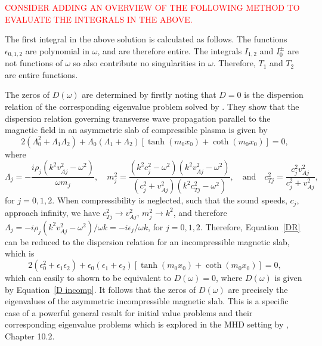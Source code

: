 \documentclass{aastex61}
\begin{document}
\textcolor{red}{CONSIDER ADDING AN OVERVIEW OF THE FOLLOWING METHOD TO EVALUATE THE INTEGRALS IN THE ABOVE.}

The first integral in the above solution is calculated as follows. The functions $\epsilon_{0,1,2}$ are polynomial in $\omega$, and are therefore entire. The integrals $I_{1,2}$ and $I_0^\pm$ are not functions of $\omega$ so also contribute no singularities in $\omega$. Therefore, $T_1$ and $T_2$ are entire functions.

The zeros of $D(\omega)$ are determined by firstly noting that $D=0$ is the dispersion relation of the corresponding eigenvalue problem solved by \cite{zsa_etal18}. They show that the dispersion relation governing transverse wave propagation parallel to the magnetic field in an asymmetric slab of compressible plasma is given by
\begin{equation}
2(\Lambda_0^2 + \Lambda_1 \Lambda_2) + \Lambda_0(\Lambda_1 + \Lambda_2)[\tanh(m_0x_0) + \coth(m_0x_0)] = 0,
\label{DR}
\end{equation}
where
\begin{equation}
\Lambda_j = -\frac{i\rho_j(k^2v_{Aj}^2 - \omega^2)}{\omega m_j},
\quad
m_j^2 = \frac{(k^2c_j^2 - \omega^2)(k^2v_{Aj}^2 - \omega^2)}{(c_j^2 + v_{Aj}^2)(k^2c_{Tj}^2 - \omega^2)},
\quad
\text{and}
\quad
c_{Tj}^2 = \frac{c_j^2v_{Aj}^2}{c_j^2 + v_{Aj}^2},
\end{equation}
for $j = 0, 1, 2$. When compressibility is neglected, such that the sound speeds, $c_j$, approach infinity, we have $c_{Tj}^2 \to v_{Aj}^2$, $m_j^2 \to k^2$, and therefore $\Lambda_j = -i\rho_j(k^2v_{Aj}^2 - \omega^2)/\omega k = -i\epsilon_j / \omega k$, for $j=0,1,2$. Therefore, Equation~\eqref{DR} can be reduced to the dispersion relation for an incompressible magnetic slab, which is
\begin{equation}
2(\epsilon_0^2 + \epsilon_1 \epsilon_2) + \epsilon_0(\epsilon_1 + \epsilon_2)[\tanh(m_0x_0) + \coth(m_0x_0)] = 0,
\end{equation}
which can easily to shown to be equivalent to $D(\omega) = 0$, where $D(\omega)$ is given by Equation~\eqref{D incomp}. It follows that the zeros of $D(\omega)$ are precisely the eigenvalues of the asymmetric incompressible magnetic slab. This is a specific case of a powerful general result for initial value problems and their corresponding eigenvalue problems which is explored in the MHD setting by \cite{goe_etal04}, Chapter 10.2.
\end{document}
